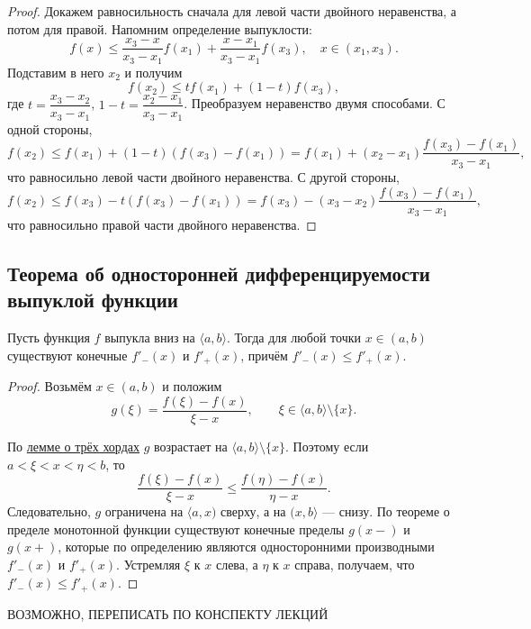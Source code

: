 \begin{proof}
	Докажем равносильность сначала для левой части двойного неравенства, а потом для правой.
	Напомним определение выпуклости: \[
		f(x) \leqslant \frac{x_3 - x}{x_3 - x_1} f(x_1) + \frac{x - x_1}{x_3 - x_1} f(x_3), \quad x \in (x_1, x_3).
	\]
	Подставим в него \(x_2\) и получим \[
		f(x_2) \leqslant t f(x_1) + (1 - t) f(x_3),
	\]
	где \(t = \dfrac{x_3 - x_2}{x_3 - x_1}\), \(1 - t = \dfrac{x_2 - x_1}{x_3 - x_1}\).
	Преобразуем неравенство двумя способами. С одной стороны, \[
		f(x_2) \leqslant f(x_1) + (1 - t)(f(x_3) - f(x_1)) = f(x_1) + (x_2 - x_1) \frac{f(x_3) - f(x_1)}{x_3 - x_1},
	\]
	что равносильно левой части двойного неравенства. С другой стороны, \[
		f(x_2) \leqslant f(x_3) - t (f(x_3) - f(x_1)) = f(x_3) - (x_3 - x_2) \frac{f(x_3) - f(x_1)}{x_3 - x_1},
	\] что равносильно правой части двойного неравенства.
\end{proof}

\subsection{Теорема об односторонней дифференцируемости выпуклой функции}

\begin{theorem}
	Пусть функция \(f\) выпукла вниз на \(\langle a, b \rangle\). Тогда для любой точки \(x \in (a, b)\) существуют конечные \(f'_-(x)\) и \(f'_+(x)\), причём \linebreak \(f'_-(x) \leqslant f'_+(x)\).
\end{theorem}

\begin{proof}
	Возьмём \(x \in (a, b)\) и положим \[
		g(\xi) = \frac{f(\xi) - f(x)}{\xi - x}, \qquad \xi \in \langle a, b \rangle \setminus \{x\}.
	\]
	
	По \hyperlink{trihordy}{лемме о трёх хордах} \(g\) возрастает на \(\langle a, b \rangle \setminus \{x\}\). Поэтому если \hbox{\(a < \xi < x < \eta < b\)}, то \[
		\frac{f(\xi) - f(x)}{\xi - x} \leqslant \frac{f(\eta) - f(x)}{\eta - x}.
	\]
	Следовательно, \(g\) ограничена на \(\langle a, x)\) сверху, а на \((x, b \rangle\) --- снизу. По теореме о пределе монотонной функции существуют конечные пределы \(g(x-)\) и \(g(x+)\), которые по определению являются односторонними производными \(f'_-(x)\) и \(f'_+(x)\). Устремляя \(\xi\) к \(x\) слева, а \(\eta\) к \(x\) справа, получаем, что \(f'_-(x) \leqslant f'_+(x)\). 
\end{proof}

ВОЗМОЖНО, ПЕРЕПИСАТЬ ПО КОНСПЕКТУ ЛЕКЦИЙ

